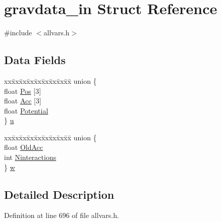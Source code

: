 \hypertarget{structgravdata__in}{
\section{gravdata\_\-in Struct Reference}
\label{structgravdata__in}
}


{\ttfamily \#include $<$allvars.h$>$}

\subsection*{Data Fields}
\begin{DoxyCompactItemize}
\item 
\begin{tabbing}
xx\=xx\=xx\=xx\=xx\=xx\=xx\=xx\=xx\=\kill
union \{\\
\>float \hyperlink{structgravdata__in_a8cac0f094027f8638152ecdcf11f1e92}{Pos} \mbox{[}3\mbox{]}\\
\>float \hyperlink{structgravdata__in_a6850a5b240d113f9c28c27762d3c44ff}{Acc} \mbox{[}3\mbox{]}\\
\>float \hyperlink{structgravdata__in_ac003758a6c6e72bb9cc1ce619fabf148}{Potential}\\
\} \hyperlink{structgravdata__in_a89df6fdf4fb1512fa2b491eb4fb10662}{u}\\

\end{tabbing}\item 
\begin{tabbing}
xx\=xx\=xx\=xx\=xx\=xx\=xx\=xx\=xx\=\kill
union \{\\
\>float \hyperlink{structgravdata__in_aba8345d83e2a1512a83563dbd87c9a3f}{OldAcc}\\
\>int \hyperlink{structgravdata__in_a6b47f6ca387f17b375c949bbc9c0572f}{Ninteractions}\\
\} \hyperlink{structgravdata__in_aa49666c565d68dcd6c3b6a6015f8a51f}{w}\\

\end{tabbing}\end{DoxyCompactItemize}


\subsection{Detailed Description}


Definition at line 696 of file allvars.h.



